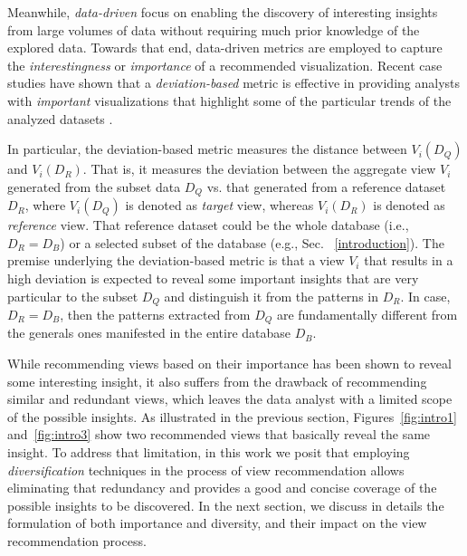 Meanwhile, {\em data-driven} focus on enabling the discovery of interesting insights from large volumes of data without requiring much prior knowledge of the explored data.
%
Towards that end, data-driven metrics are employed to capture the {\em interestingness} or {\em importance} of a recommended visualization. 
%
Recent case studies have shown that a {\em deviation-based} metric is effective in providing analysts with {\em important} visualizations that highlight some of the particular trends of the analyzed datasets \cite{Vartak2015, Vartak2014, TKDEHumaira, Ehsan2016}.

%

%
In particular, the deviation-based metric measures the distance between $V_i(D_Q)$ and $V_i(D_R)$. 
%
That is, it measures the deviation between the aggregate view $V_i$ generated from the subset data $D_Q$ vs. that generated from a reference dataset $D_R$, where $V_i(D_Q)$ is denoted as {\em target} view, whereas $V_i(D_R)$ is denoted as {\em reference} view. 
%
That reference dataset could be the whole database (i.e., $D_R=D_B$) or a selected subset of the database (e.g., Sec. ~\ref{introduction}). 
%
%
The premise underlying the deviation-based metric is that a view $V_i$ that results in a high deviation is expected to reveal some important insights that are very particular to the subset $D_Q$ and distinguish it from the patterns in $D_R$.
%
In case, $D_R=D_B$, then the patterns extracted from $D_Q$ are fundamentally different from the generals ones manifested in the entire database $D_B$.  

While recommending views based on their importance has been shown to reveal some interesting insight, it also suffers from the drawback of recommending similar and redundant views, which leaves the data analyst with a limited scope of the possible insights.    
As illustrated in the previous section, Figures~\ref{fig:intro1} and~\ref{fig:intro3} show two recommended views that basically reveal the same insight.  
%
To address that limitation, in this work we posit that employing {\em diversification} techniques in the process of view recommendation allows eliminating that redundancy and provides a good and concise coverage of the possible insights to be discovered.
In the next section, we discuss in details the formulation of both importance and diversity, and their impact on the view recommendation process.
%


